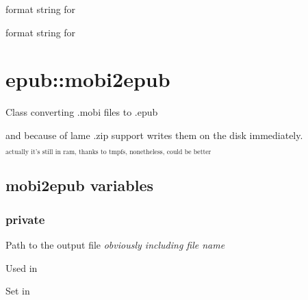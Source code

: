 \documentclass[letterpaper,10pt,english]{sphinxmanual}
\begin{document}

\begin{fulllineitems}
\label{epub:itemid__ss}
format string for {\hyperref[epub:content_opf__ss]{}}

\end{fulllineitems}


\begin{fulllineitems}
\label{epub:itemref__ss}
format string for {\hyperref[epub:content_opf__ss]{}}

\end{fulllineitems}



\section{epub::mobi2epub}
\label{epub:epub-mobi2epub}

\begin{fulllineitems}
\label{epub:epub::mobi2epub}
Class converting .mobi files to .epub

and because of lame
.zip support  writes them on the disk immediately.

$_{\text{actually it's still in ram, thanks to tmpfs, nonetheless, could be better}}$

\end{fulllineitems}



\subsection{mobi2epub variables}
\label{epub:mobi2epub-variables}

\subsubsection{private}
\label{epub:private}

\begin{fulllineitems}
\label{epub:path_out__boost::filesystem::path}
Path to the output file \emph{obviously including file name}

Used in {\hyperref[epub:mobi2epub::directory_to_epubC]{}}

Set in {\hyperref[epub:mobi2epub::mobi2epub__mobi2epubR]{}}

\end{fulllineitems}
\end{document}
